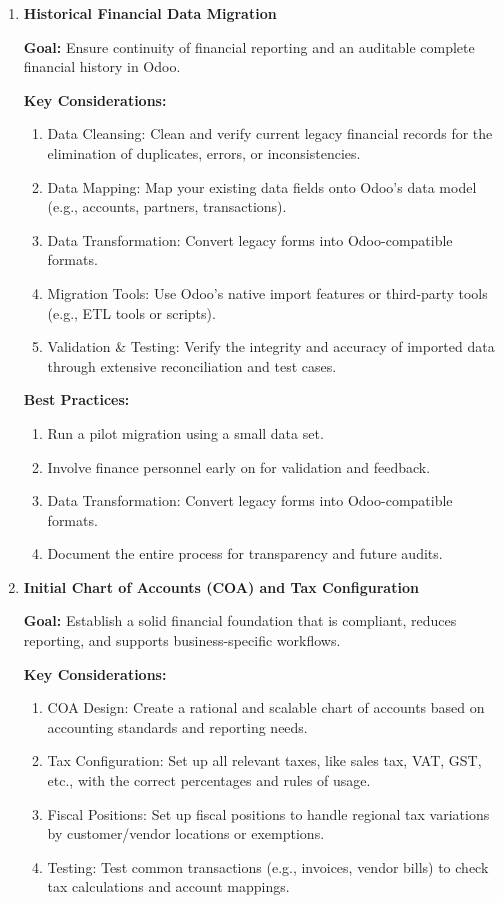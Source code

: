 \documentclass[11pt,a4paper]{article}
\begin{document}
\begin{enumerate}
    \item \textbf{Historical Financial Data Migration}

    \textbf{Goal:} Ensure continuity of financial reporting and an auditable complete financial history in Odoo.
    \medskip

    \textbf{Key Considerations:}
    \begin{enumerate}
        \item Data Cleansing: Clean and verify current legacy financial records for the elimination of duplicates, errors, or inconsistencies.
        \item  Data Mapping: Map your existing data fields onto Odoo's data model (e.g., accounts, partners, transactions).
        \item Data Transformation: Convert legacy forms into Odoo-compatible formats.
        \item Migration Tools: Use Odoo's native import features or third-party tools (e.g., ETL tools or scripts).
        \item Validation \& Testing: Verify the integrity and accuracy of imported data through extensive reconciliation and test cases.
    \end{enumerate}
    \medskip

    \textbf{Best Practices:}
    \begin{enumerate}
        \item Run a pilot migration using a small data set.
        \item  Involve finance personnel early on for validation and feedback.
        \item Data Transformation: Convert legacy forms into Odoo-compatible formats.
        \item Document the entire process for transparency and future audits.
    \end{enumerate}

    \item \textbf{Initial Chart of Accounts (COA) and Tax Configuration}

    \textbf{Goal:} Establish a solid financial foundation that is compliant, reduces reporting, and supports business-specific workflows.
    \medskip

    \textbf{Key Considerations:}
    \begin{enumerate}
        \item COA Design: Create a rational and scalable chart of accounts based on accounting standards and reporting needs.
        \item Tax Configuration: Set up all relevant taxes, like sales tax, VAT, GST, etc., with the correct percentages and rules of usage.
        \item Fiscal Positions: Set up fiscal positions to handle regional tax variations by customer/vendor locations or exemptions.
        \item Testing: Test common transactions (e.g., invoices, vendor bills) to check tax calculations and account mappings.
    \end{enumerate}
    \medskip


\end{enumerate}
\end{document}
